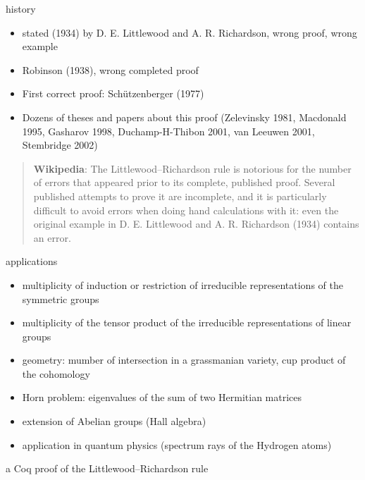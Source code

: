 \documentclass{beamer}
\let\emph\alert
\begin{document}
\begin{frame}{history}
  \begin{itemize}
  \item stated (1934) by D. E. Littlewood and A. R. Richardson, wrong proof,
    wrong example
  \item Robinson (1938), wrong completed proof
  \item First correct proof: Schützenberger (1977)
  \item Dozens of theses and papers about this proof (Zelevinsky 1981, Macdonald
    1995, Gasharov 1998, Duchamp-H-Thibon 2001, van Leeuwen 2001, Stembridge
    2002)
  \end{itemize}

  \begin{quotation}\small
    \textbf{Wikipedia}: The Littlewood–Richardson rule is notorious for the
    number of errors that appeared prior to its complete, published
    proof. Several published attempts to prove it are incomplete, and it is
    particularly difficult to avoid errors when doing hand calculations with
    it: even the original example in D. E. Littlewood and A. R. Richardson
    (1934) contains an error.
 \end{quotation}
\end{frame}


\begin{frame}{applications}
  \begin{itemize}
  \item multiplicity of induction or restriction of irreducible representations
    of the symmetric groups
  \item multiplicity of the tensor product of the irreducible representations
    of linear groups
  \item geometry: mumber of intersection in a grassmanian variety, cup product
    of the cohomology
  \item Horn problem: eigenvalues of the sum of two Hermitian matrices
  \item extension of Abelian groups (Hall algebra)
  \item application in quantum physics (spectrum rays of the Hydrogen atoms)
  \end{itemize}
\end{frame}

\begin{frame}
  \begin{center}
    \emph{a Coq proof of the Littlewood–Richardson rule} \\
    \hrulefill
  \end{center}
\end{frame}
\end{document}
